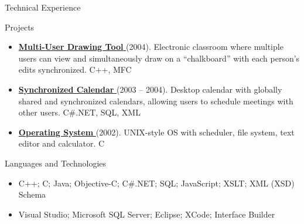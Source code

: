 \documentclass[]{mcdowellcv_updated}
\begin{document}
	\begin{cvsection}{Technical Experience}
		\begin{cvsubsection}{Projects}{}{}
			\begin{itemize}
				\item \href{https://www.github.com/gayle_mcdowell_example/project_link2}{\textbf{Multi-User Drawing Tool} \textcolor{custom_dark_blue}{\ExternalLink}} (2004). Electronic classroom where multiple users can view and simultaneously draw on a “chalkboard” with each person’s edits synchronized.  C++, MFC
				\item \href{https://www.github.com/gayle_mcdowell_example/project_link3}{\textbf{Synchronized Calendar} \textcolor{custom_dark_blue}{\ExternalLink}} (2003 – 2004). Desktop calendar with globally shared and synchronized calendars, allowing users to schedule meetings with other users.  C\#.NET, SQL, XML
				\item \href{https://www.github.com/gayle_mcdowell_example/project_link4}{\textbf{Operating System} \textcolor{custom_dark_blue}{\ExternalLink}} (2002).  UNIX-style OS with scheduler, file system, text editor and calculator. C
			\end{itemize}
		\end{cvsubsection}
	\end{cvsection}
	
	\begin{cvsection}{Languages and Technologies}
		\begin{cvsubsection}{}{}{}	
			\begin{itemize}
				\item C++; C; Java; Objective-C; C\#.NET; SQL; JavaScript; XSLT; XML (XSD) Schema 
				\item Visual Studio; Microsoft SQL Server; Eclipse; XCode; Interface Builder
			\end{itemize}
		\end{cvsubsection}
	\end{cvsection}
	
\end{document}
